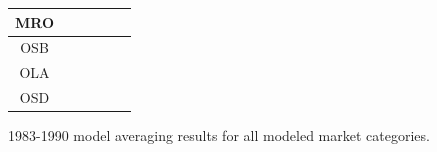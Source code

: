\documentclass[12pt]{article}
\begin{document}
\begin{landscape}
\begin{figure}
{\begin{minipage}[c]{0.3\textwidth}
\begin{tabular}{|c|c|c|c|c|c|}
        MRO&\cellcolor[HTML]{4DAF4A}&\cellcolor[HTML]{4DAF4A}&\cellcolor[HTML]{4DAF4A}&\cellcolor[HTML]{4DAF4A}&\cellcolor[HTML]{4DAF4A}\\ \hline %
        OSB&\cellcolor[HTML]{984EA3}&\cellcolor[HTML]{984EA3}&\cellcolor[HTML]{984EA3}&\cellcolor[HTML]{984EA3}&\cellcolor[HTML]{984EA3}\\ \hline %
        OLA&\cellcolor[HTML]{984EA3}&\cellcolor[HTML]{984EA3}&\cellcolor[HTML]{984EA3}&\cellcolor[HTML]{984EA3}&\cellcolor[HTML]{984EA3}\\ \hline %
        OSD&\cellcolor[HTML]{984EA3}&\cellcolor[HTML]{984EA3}&\cellcolor[HTML]{984EA3}&\cellcolor[HTML]{984EA3}&\cellcolor[HTML]{984EA3}\\ \hline %
\end{tabular}
\end{minipage}}
\caption{1983-1990 model averaging results for all modeled market categories.}
\label{colorTabApp83}
\end{figure}
\end{landscape}

%
\clearpage
%
\end{document}
